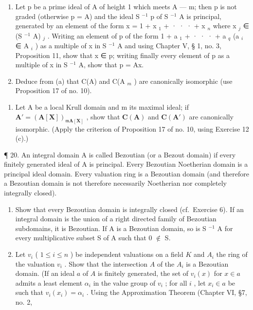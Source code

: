 \begin{enumerate}
\def\labelenumi{(\alph{enumi})}
\item
  Let p be a prime ideal of A of height 1 which meets A --- m; then p is not graded (otherwise p = A) and the ideal S \(^{-1}\) p of S \(^{-1}\) A is principal, generated by an element of the form x = 1 + x \(_{1}\) + · · · + x \(_{n}\) where x \(_{j}\) ∈ (S \(^{-1}\) A) \(_{j}\) . Writing an element of p of the form 1 + a \(_{1}\) + · · · + a \(_{q}\) (a \(_{i}\) ∈ A \(_{i}\) ) as a multiple of x in S \(^{-1}\) A and using Chapter V, § 1, no. 3, Proposition 11, show that x ∈ p; writing finally every element of p as a multiple of x in S \(^{-1}\) A, show that p = Ax.
\item
  Deduce from (a) that C(A) and C(A \(_{m}\) ) are canonically isomorphic (use Proposition 17 of no. 10).
\end{enumerate}

\begin{enumerate}
\def\labelenumi{\arabic{enumi}.}
\setcounter{enumi}{18}
\tightlist
\item
  Let A be a local Krull domain and m its maximal ideal; if \(\mathbf{A}' = (\mathbf{A}[\mathbf{X}])_{\mathfrak{m}\mathbf{A}[\mathbf{X}]}\) , show that \(\mathbf{C}(\mathbf{A})\) and \(\mathbf{C}(\mathbf{A}')\) are canonically isomorphic. (Apply the criterion of Proposition 17 of no. 10, using Exercise 12 (c).)
\end{enumerate}

¶ 20. An integral domain A is called Bezoutian (or a Bezout domain) if every finitely generated ideal of A is principal. Every Bezoutian Noetherian domain is a principal ideal domain. Every valuation ring is a Bezoutian domain (and therefore a Bezoutian domain is not therefore necessarily Noetherian nor completely integrally closed).

\begin{enumerate}
\def\labelenumi{(\alph{enumi})}
\item
  Show that every Bezoutian domain is integrally closed (cf.~Exercise 6). If an integral domain is the union of a right directed family of Bezoutian subdomains, it is Bezoutian. If A is a Bezoutian domain, so is S \(^{-1}\) A for every multiplicative subset S of A such that 0 \(\notin\) S.
\item
  Let \(v_{i}\) ( \(1 \leqslant i \leqslant n\) ) be independent valuations on a field \(K\) and \(A_{i}\) the ring of the valuation \(v_{i}\) . Show that the intersection \(A\) of the \(A_{i}\) is a Bezoutian domain. (If an ideal \(a\) of \(A\) is finitely generated, the set of \(v_{i}(x)\) for \(x \in a\) admits a least element \(\alpha_{i}\) in the value group of \(v_{i}\) ; for all \(i\) , let \(x_{i} \in a\) be such that \(v_{i}(x_{i}) = \alpha_{i}\) . Using the Approximation Theorem (Chapter VI, §7, no. 2,
\end{enumerate}

